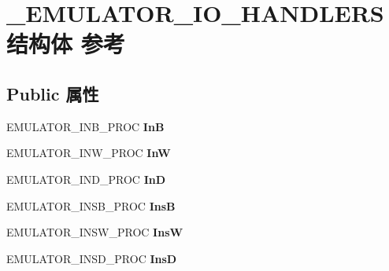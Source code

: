 \hypertarget{struct___e_m_u_l_a_t_o_r___i_o___h_a_n_d_l_e_r_s}{}\section{\+\_\+\+E\+M\+U\+L\+A\+T\+O\+R\+\_\+\+I\+O\+\_\+\+H\+A\+N\+D\+L\+E\+R\+S结构体 参考}
\label{struct___e_m_u_l_a_t_o_r___i_o___h_a_n_d_l_e_r_s}
\subsection*{Public 属性}
\begin{DoxyCompactItemize}
\item 
\mbox{\label{struct___e_m_u_l_a_t_o_r___i_o___h_a_n_d_l_e_r_s_ac0b4ec6bc517dffdc15bf3e1ba9cccbf}} 
E\+M\+U\+L\+A\+T\+O\+R\+\_\+\+I\+N\+B\+\_\+\+P\+R\+OC {\bfseries InB}
\item 
\mbox{\label{struct___e_m_u_l_a_t_o_r___i_o___h_a_n_d_l_e_r_s_ac779d5bd1a5126bde6138a71b2d4598f}} 
E\+M\+U\+L\+A\+T\+O\+R\+\_\+\+I\+N\+W\+\_\+\+P\+R\+OC {\bfseries InW}
\item 
\mbox{\label{struct___e_m_u_l_a_t_o_r___i_o___h_a_n_d_l_e_r_s_adcadd8e176527703af5ec5abb4130a8a}} 
E\+M\+U\+L\+A\+T\+O\+R\+\_\+\+I\+N\+D\+\_\+\+P\+R\+OC {\bfseries InD}
\item 
\mbox{\label{struct___e_m_u_l_a_t_o_r___i_o___h_a_n_d_l_e_r_s_aeb5bb772c13fb30854d35ddc8f2b85da}} 
E\+M\+U\+L\+A\+T\+O\+R\+\_\+\+I\+N\+S\+B\+\_\+\+P\+R\+OC {\bfseries InsB}
\item 
\mbox{\label{struct___e_m_u_l_a_t_o_r___i_o___h_a_n_d_l_e_r_s_ab3e08f8797299ef63e118a3f4f916026}} 
E\+M\+U\+L\+A\+T\+O\+R\+\_\+\+I\+N\+S\+W\+\_\+\+P\+R\+OC {\bfseries InsW}
\item 
\mbox{\label{struct___e_m_u_l_a_t_o_r___i_o___h_a_n_d_l_e_r_s_ab21e370446a9f6143533b6b26ae6d3a9}} 
E\+M\+U\+L\+A\+T\+O\+R\+\_\+\+I\+N\+S\+D\+\_\+\+P\+R\+OC {\bfseries InsD}

\end{DoxyCompactItemize}

